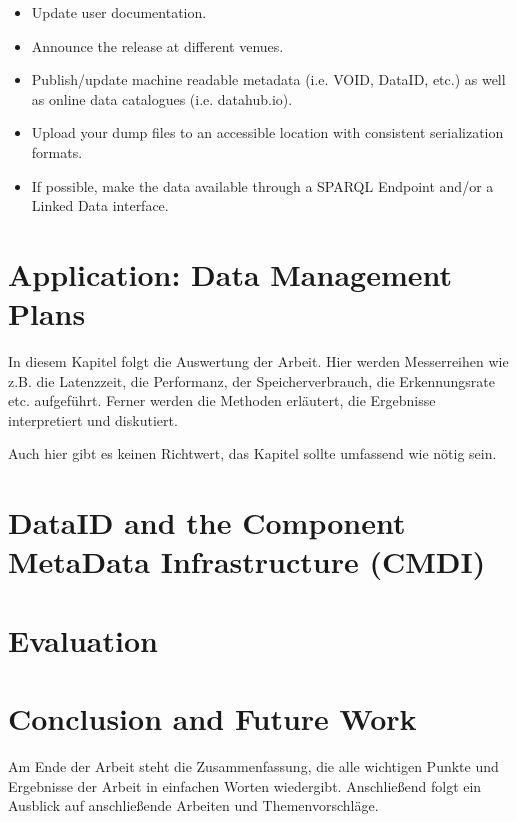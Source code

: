 \documentclass[a4paper,english,twoside,BCOR1.5cm,headsepline,DIV12,appendixprefix,final,12pt]{scrbook}
\begin{document}
\begin{itemize}
\itemsep0em 
\item Update user documentation.
\item Announce the release at different venues. 
\item Publish/update machine readable metadata (i.e. VOID, DataID, etc.) as well as online data catalogues (i.e. datahub.io).
\item Upload your dump files to an accessible location with consistent serialization formats.
\item If possible, make the data available through a SPARQL Endpoint and/or a Linked Data interface.
\end{itemize}


\chapter{Application: Data Management Plans}
\label{chap:dmp}

In diesem Kapitel folgt die Auswertung der Arbeit. Hier werden Messerreihen wie z.B. die Latenzzeit, die Performanz, der Speicherverbrauch, die Erkennungsrate etc. aufgeführt. Ferner werden die Methoden erläutert, die Ergebnisse interpretiert und diskutiert.

Auch hier gibt es keinen Richtwert, das Kapitel sollte umfassend wie nötig sein.

\chapter{DataID and the Component MetaData Infrastructure (CMDI)}
\label{chap:pocmap}

\chapter{Evaluation}
\label{chap:evaluation}

\chapter{Conclusion and Future Work}
\label{chap:future}
Am Ende der Arbeit steht die Zusammenfassung, die alle wichtigen Punkte und Ergebnisse der Arbeit in einfachen Worten wiedergibt. Anschließend folgt ein Ausblick auf anschließende Arbeiten und Themenvorschläge.
\end{document}
